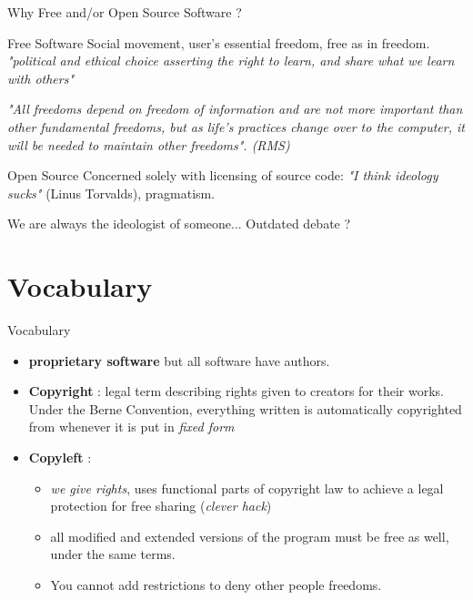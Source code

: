 \documentclass{beamer}
\begin{document}
\begin{frame}{Why Free and/or Open Source Software ?}

  \begin{block}{Free Software}
    Social movement, user's essential freedom, free as in
    freedom. \textit{"political and ethical choice asserting the right
      to learn, and share what we learn with others"}
  \end{block}

  \textit{"All freedoms depend on freedom of information and are not
    more important than other fundamental freedoms, but as life's
    practices change over to the computer, it will be needed to
    maintain other freedoms". (RMS)}

  \pause

  \begin{block}{Open Source}
    Concerned solely with licensing of source code: \textit{"I think
      ideology sucks"} (Linus Torvalds), pragmatism.
  \end{block}

  We are always the ideologist of someone... Outdated debate ?
\end{frame}

\section{Vocabulary}


\begin{frame}{Vocabulary}
  \begin{itemize}
  \item \textbf{proprietary software} but all software have authors.
  \item \textbf{Copyright} : legal term describing rights given to
    creators for their works. Under the Berne Convention, everything
    written is automatically copyrighted from whenever it is put in
    \emph{fixed form}
  \item \textbf{Copyleft} :
    \begin{itemize}
    \item \textit{we give rights}, uses functional parts of copyright
      law to achieve a legal protection for free sharing (\emph{clever
        hack})
    \item all modified and extended versions of the program must be
      free as well, under the same terms.
    \item You cannot add restrictions to deny other people freedoms.
    \end{itemize}

  \end{itemize}
\end{frame}
\end{document}
